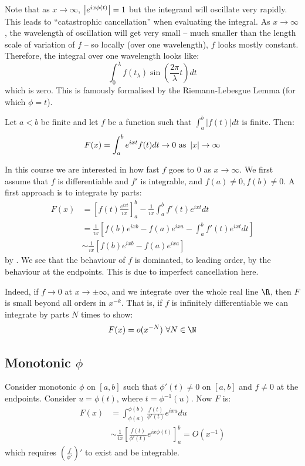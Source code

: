 \documentclass[../Main.tex]{subfiles}
\begin{document}
Note that as $x \to \infty$, $\left|e^{ix\phi(t)}\right| = 1$ but the integrand will oscillate very rapidly. This leads to ``catastrophic cancellation'' when evaluating the integral. As $x \to \infty$, the wavelength of oscillation will get very small -- much smaller than the length scale of variation of $f$ -- so locally (over one wavelength), $f$ looks mostly constant. Therefore, the integral over one wavelength looks like:
\begin{equation*}
    \int_0^\lambda f(t_\lambda) \sin\left(\frac{2\pi}{\lambda}t\right) dt 
\end{equation*}
which is zero. This is famously formalised by the Riemann-Lebesgue Lemma (for which $\phi = t$).
\begin{theorem}
    Let $a < b$ be finite and let $f$ be a function such that $\int_{a}^{b} |f(t)| dt$ is finite. Then:
    \begin{equation*}
        F(x) = \int_{a}^{b} e^{ixt} f(t) dt \to 0 \text{ as } \left|x\right| \to \infty
    \end{equation*}
    \label{thmRiemannLebes}
\end{theorem}
In this course we are interested in how fast $f$ goes to $0$ as $x \to \infty$. We first assume that $f$ is differentiable and $f'$ is integrable, and $f(a) \neq 0, f(b) \neq 0$. A first approach is to integrate by parts:
\begin{align*}
    F(x) &= \left[f(t) \frac{e^{ixt}}{ix}\right]_a^b - \frac{1}{ix} \int_{a}^{b} f'(t) e^{ixt} dt  \\
    &= \frac1{ix} \left[f(b) e^{ixb} - f(a) e^{ixa} - \int_{a}^{b} f'(t) e^{ixt} dt \right] \\
    &\sim \frac1{ix} \left[f(b) e^{ixb} - f(a) e^{ixa}\right] 
\end{align*}
by . We see that the behaviour of $f$ is dominated, to leading order, by the behaviour at the endpoints. This is due to imperfect cancellation here.

Indeed, if $f \to 0$ at $x \to \pm \infty$, and we integrate over the whole real line $\R$, then $F$ is small beyond all orders in $x^{-k}$. That is, if $f$ is infinitely differentiable we can integrate by parts $N$ times to show:
\begin{equation*}
    F(x) = o(x^{-N}) ~\forall N \in \N
\end{equation*}
\subsection{Monotonic \texorpdfstring{$\phi$}{phi}}
Consider monotonic $\phi$ on $[a, b]$ such that $\phi'(t) \neq 0$ on $[a, b]$ and $f \neq 0$ at the endpoints. Consider $u = \phi(t)$, where $t = \phi^{-1}(u)$. Now $F$ is:
\begin{align*}
    F(x) &= \int_{\phi(a)}^{\phi(b)} \frac{f(t)}{\phi'(t)}e^{ixu} du \\
    &\sim \frac{1}{ix} \left[\frac{f(t)}{\phi'(t)} e^{ix\phi(t)}\right]_a^b = O(x^{-1})
\end{align*}
which requires $\left(\frac{f}{\phi'}\right)'$ to exist and be integrable.
\end{document}
